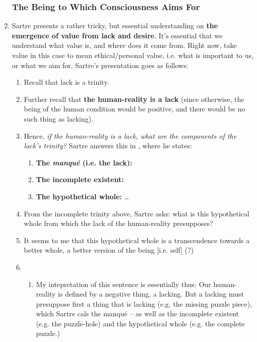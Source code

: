 \begin{enumerate}
  \subsubsection*{The Being to Which Consciousness Aims For}
  \item Sartre presents a rather tricky, but essential understanding on \textbf{the emergence of value from lack and desire}. It's essential that we understand what value is, and where does it come from. Right now, take value in this case to mean ethical/personal value, i.e. what is important to us, or what we aim for. Sartre's presentation goes as follows:
  \begin{enumerate}
    \item Recall that lack is a trinity.
    \item Further recall that \textbf{the human-reality is a lack} (since otherwise, the being of the human condition would be positive, and there would be no such thing as lacking).
    \item Hence, \emph{if the human-reality is a lack, what are the components of the lack's trinity?} Sartre answers this in \autocite[140]{sartre}, where he states:
    \begin{enumerate}
      \item \textbf{The \emph{manqué} (i.e. the lack):} 
      \item \textbf{The incomplete existent:} 
      \item \textbf{The hypothetical whole:} \ldots
    \end{enumerate}
    \item From the incomplete trinity above, Sartre asks: what is this hypothetical whole from which the lack of the human-reality presupposes?
    \item It seems to me that this hypothetical whole is a transcendence towards a better whole, a better version of the being [i.e. self] (?)
    \item {}
    \begin{enumerate}
      \item My intepretation of this sentence is essentially thus: Our human-reality is defined by a negative thing, a lacking. But a lacking must presuppose first a thing that is lacking (e.g. the missing puzzle piece), which Sartre cals the manqué -- as well as the incomplete existent (e.g. the puzzle-hole) and the hypothetical whole (e.g. the complete puzzle.)

\end{enumerate}
\end{enumerate}
\end{enumerate}
